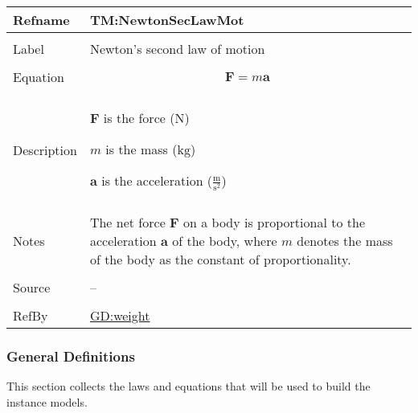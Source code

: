 \documentclass[12pt]{article}
\begin{document}
\begin{minipage}{\textwidth}
\begin{tabular}{>{\raggedright}p{}>{\raggedright\arraybackslash}p{}}
\toprule \textbf{Refname} & \textbf{TM:NewtonSecLawMot}
\label{TM:NewtonSecLawMot}
\\ \midrule \\
Label & Newton's second law of motion
        
\\ \midrule \\
Equation & \begin{displaymath}
           \symbf{F}=m \symbf{a}
           \end{displaymath}
\\ \midrule \\
Description & \begin{symbDescription}
              \item{$\symbf{F}$ is the force (${\text{N}}$)}
              \item{$m$ is the mass (${\text{kg}}$)}
              \item{$\symbf{a}$ is the acceleration ($\frac{\text{m}}{\text{s}^{2}}$)}
              \end{symbDescription}
\\ \midrule \\
Notes & The net force $\symbf{F}$ on a body is proportional to the acceleration $\symbf{a}$ of the body, where $m$ denotes the mass of the body as the constant of proportionality.
        
\\ \midrule \\
Source & --
         
\\ \midrule \\
RefBy & \hyperref[GD:weight]{GD:weight}
        
\\ \bottomrule
\end{tabular}
\end{minipage}
\subsubsection{General Definitions}
\label{Sec:GDs}
This section collects the laws and equations that will be used to build the instance models.
\end{document}
